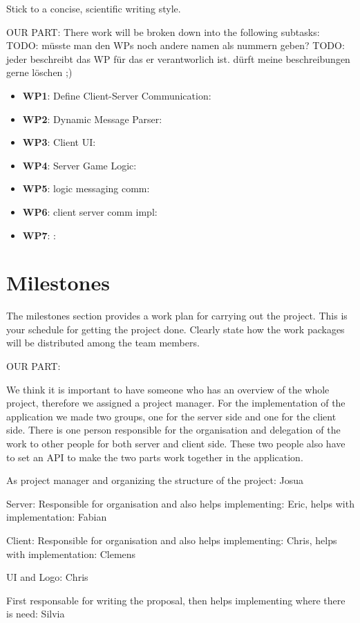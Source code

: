 \documentclass{report}
\begin{document}
Stick to a concise, scientific writing style. 

OUR PART:
There work will be broken down into the following subtasks:
TODO: müsste man den WPs noch andere namen als nummern geben?
TODO: jeder beschreibt das WP für das er verantworlich ist. dürft meine beschreibungen gerne löschen ;)
\begin{itemize}
        \item {\bf WP1}: Define Client-Server Communication:   
        \item {\bf WP2}: Dynamic Message Parser:   
        \item {\bf WP3}: Client UI: 
        \item {\bf WP4}: Server Game Logic: 
        \item {\bf WP5}: logic messaging comm:
        \item {\bf WP6}: client server comm impl:
        \item {\bf WP7}: :
\end{itemize}

\section{Milestones}
The milestones section provides a work plan for carrying out the project.
This is your schedule for getting the project done.
Clearly state how the work packages will be distributed among the team members. 


OUR PART:


We think it is important to have someone who has an overview of the whole project, therefore we assigned a project manager. For the implementation of the application we made two groups, one for the server side and one for the client side. There is one person responsible for the organisation and delegation of the work to other people for both server and client side. These two people also have to set an API to make the two parts work together in the application.

As project manager and organizing the structure of the project: Josua

Server: Responsible for organisation and also helps implementing: Eric, helps with implementation: Fabian

Client: Responsible for organisation and also helps implementing: Chris, helps with implementation: Clemens

UI and Logo: Chris

First responsable for writing the proposal, then helps implementing where there is need: Silvia




\end{document}
